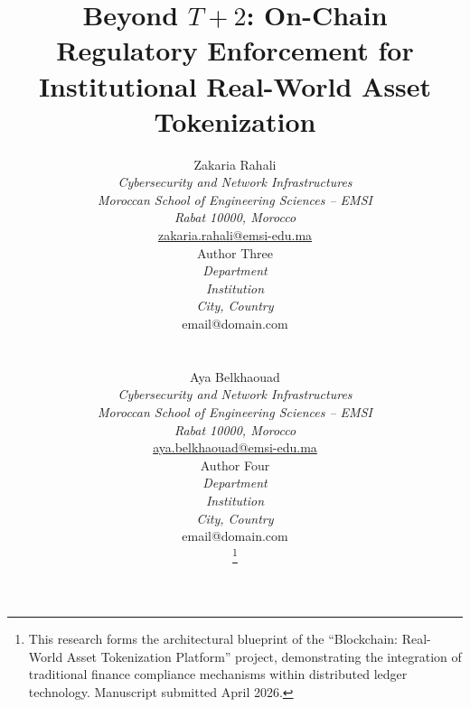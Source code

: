 \documentclass[journal,10pt,twocolumn]{IEEEtran}
\begin{document}

\title{Beyond $T+2$: On-Chain Regulatory Enforcement for Institutional Real-World Asset Tokenization}

\author{%
\begin{minipage}[t]{0.46\linewidth}
  \centering
  Zakaria Rahali\\[3pt]
  {\small\itshape Cybersecurity and Network Infrastructures\\
  Moroccan School of Engineering Sciences -- EMSI\\
  Rabat 10000, Morocco\\}
  {\small\upshape\href{mailto:zakaria.rahali@emsi-edu.ma}{zakaria.rahali@emsi-edu.ma}}
\end{minipage}%
\hfill%
\begin{minipage}[t]{0.46\linewidth}
  \centering
  Author Three\\[3pt]
  {\small\itshape Department\\
  Institution\\
  City, Country\\}
  {\small\upshape email@domain.com}
\end{minipage}\\[4ex]
\begin{minipage}[t]{0.46\linewidth}
  \centering
  Aya Belkhaouad\\[3pt]
  {\small\itshape Cybersecurity and Network Infrastructures\\
  Moroccan School of Engineering Sciences -- EMSI\\
  Rabat 10000, Morocco\\}
  {\small\upshape\href{mailto:aya.belkhaouad@emsi-edu.ma}{aya.belkhaouad@emsi-edu.ma}}
\end{minipage}%
\hfill%
\begin{minipage}[t]{0.46\linewidth}
  \centering
  Author Four\\[3pt]
  {\small\itshape Department\\
  Institution\\
  City, Country\\}
  {\small\upshape email@domain.com}
\end{minipage}%
\thanks{This research forms the architectural blueprint of the ``Blockchain: Real-World Asset Tokenization Platform'' project, demonstrating the integration of traditional finance compliance mechanisms within distributed ledger technology. Manuscript submitted April 2026.}}
\end{document}
